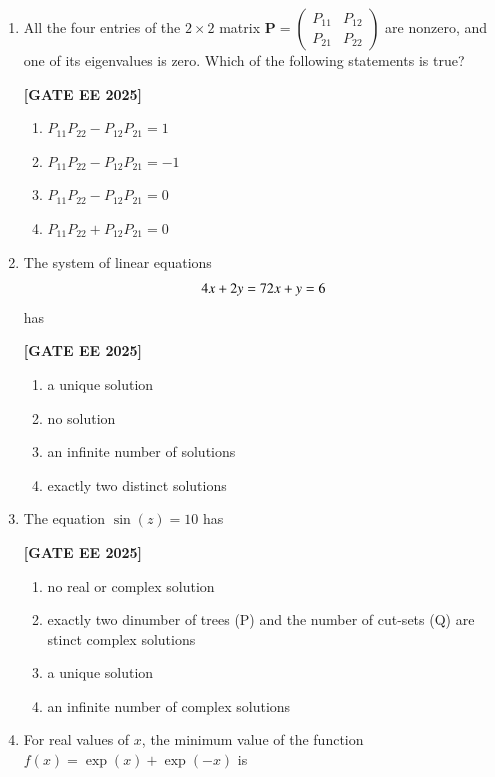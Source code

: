 \documentclass[12pt]{article}
\begin{document}
\begin{enumerate}[leftmargin=2.5em, label=\textbf{Q.\arabic*}., itemsep=2em]
\item All the four entries of the $2\times2$ matrix $\mathbf{P} = \begin{pmatrix} P_{11} & P_{12}\\ P_{21} & P_{22} \end{pmatrix}$ are nonzero, and one of its eigenvalues is zero. Which of the following statements is true?
 
\noindent \textbf{[GATE EE 2025]}
    \begin{enumerate}[label=(\Alph*)]
        \item $P_{11}P_{22} - P_{12}P_{21} = 1$
        \item $P_{11}P_{22} - P_{12}P_{21} = -1$
        \item $P_{11}P_{22} - P_{12}P_{21} = 0$
        \item $P_{11}P_{22} + P_{12}P_{21} = 0$
    \end{enumerate}

\item The system of linear equations
\[
4x + 2y = 7 \\
2x + y = 6
\]
has
 
\noindent \textbf{[GATE EE 2025]}
    \begin{enumerate}[label=(\Alph*)]
        \item a unique solution
        \item no solution
        \item an infinite number of solutions
        \item exactly two distinct solutions
    \end{enumerate}

\item The equation $\sin(z) = 10$ has
 
\noindent \textbf{[GATE EE 2025]}
    \begin{enumerate}[label=(\Alph*)]
        \item no real or complex solution
        \item exactly two dinumber of trees (P) and the number of cut-sets (Q) are
stinct complex solutions
        \item a unique solution
        \item an infinite number of complex solutions
    \end{enumerate}

\item For real values of $x$, the minimum value of the function $f(x) = \exp(x) + \exp(-x)$ is
 

\end{enumerate}
\end{document}
